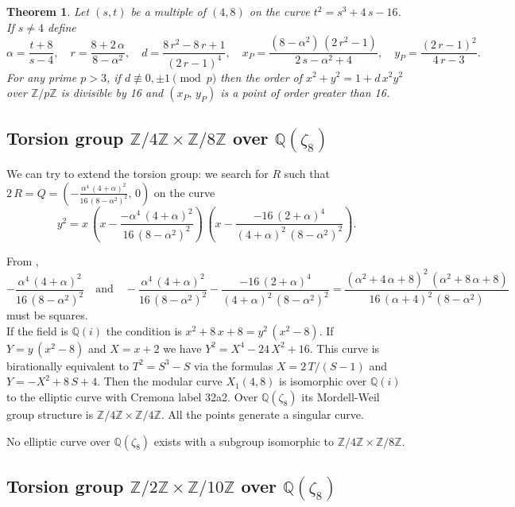 \documentclass[a4paper, 11pt, pdftex]{report}
\theoremstyle{plain}
\newtheorem{theorem}{Theorem}[chapter]
\theoremstyle{definition}
\begin{document}
\begin{theorem}
Let $(s, t)$ be a multiple of $(4, 8)$ on the curve $t^2 = s^3 + 4\,s - 16$. If
$s \neq 4$  define
$$\alpha = \frac{t + 8}{s - 4},\quad r = \frac{8 + 2\,\alpha}{8 - \alpha^2},\quad
d = \frac{8\,r^2 - 8\,r + 1}{(2\,r - 1)^4},\quad
x_P = \frac{(8 - \alpha^2)\,(2\,r^2 - 1)}{2\,s - \alpha^2 + 4},\quad
y_P = \frac{(2\,r - 1)^2}{4\,r - 3}.$$
For any prime $p > 3$, if $d \not\equiv 0, \pm1 \pmod p$ then the order of
$x^2 + y^2 = 1 + d\,x^2y^2$ over $\mathbb{Z}/p\mathbb{Z}$ is divisible by 16
and $(x_P,\,y_P)$ is a point of order greater than 16.
\end{theorem}

\subsection{Torsion group $\mathbb{Z}/4\mathbb{Z} \times \mathbb{Z}/8\mathbb{Z}$ over $\mathbb{Q}(\zeta_8)$}

We can try to extend the torsion group: we search for $R$ such that
$2\,R = Q = \left(-\frac{\alpha^4\,(4 + \alpha)^2}{16\,(8 - \alpha^2)^2},\, 0\right)$
on the curve
$$y^2 = x\, \left(x - \frac{-\alpha^4\,(4 + \alpha)^2}{16\,(8 - \alpha^2)^2} \right)\,
 \left(x - \frac{-16\,(2 + \alpha)^4}{(4 + \alpha)^2\,(8 - \alpha^2)^2} \right).$$

From \cite[Theorem 4.2]{Knapp1},
$$-\frac{\alpha^4\,(4 + \alpha)^2}{16\,(8 - \alpha^2)^2} \quad \text{and} \quad
-\frac{\alpha^4\,(4 + \alpha)^2}{16\,(8 - \alpha^2)^2}
 - \frac{-16\,(2 + \alpha)^4}{(4 + \alpha)^2\,(8 - \alpha^2)^2}
 = \frac{(\alpha^2 + 4\,\alpha + 8)^2\,(\alpha^2 + 8\,\alpha + 8)}{16\,(\alpha+4)^2\,(8 - \alpha^2)}$$
must be squares.\\
If the field is $\mathbb{Q}(i)$ the condition is $x^2 + 8\,x + 8 = y^2\,(x^2 - 8)$.
If $Y = y\,(x^2 - 8)$ and $X = x + 2$ we have $Y^2 = X^4 - 24\,X^2 + 16$. This curve is
birationally equivalent to $T^2 = S^3 - S$ via the formulas $X = 2\,T / (S - 1)$ and
$Y = -X^2 + 8\,S + 4$. Then the modular curve $X_1(4, 8)$ is isomorphic over $\mathbb{Q}(i)$ to
the elliptic curve with Cremona label 32a2. Over $\mathbb{Q}(\zeta_8)$ its Mordell-Weil group
structure is $\mathbb{Z}/4\mathbb{Z} \times \mathbb{Z}/4\mathbb{Z}$. All the points generate
a singular curve.

No elliptic curve over $\mathbb{Q}(\zeta_8)$ exists with a subgroup isomorphic to
$\mathbb{Z}/4\mathbb{Z} \times \mathbb{Z}/8\mathbb{Z}$.

\subsection{Torsion group $\mathbb{Z}/2\mathbb{Z} \times \mathbb{Z}/10\mathbb{Z}$ over $\mathbb{Q}(\zeta_8)$}
\end{document}
